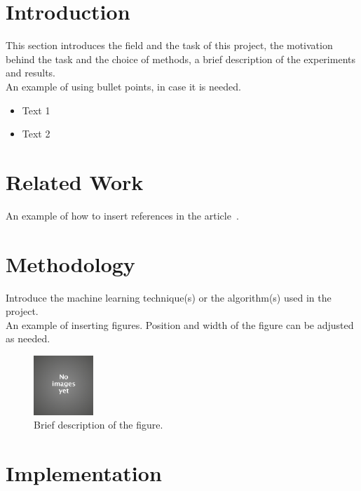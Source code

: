 \documentclass[11pt]{article}
\title{\MakeMeBlue{Enter the project name here}}
\author{Your Name}
\date{Date of Submission}
\begin{document}
\maketitle

\section{Introduction}
This section introduces the field and the task of this project, the motivation behind the task and the choice of methods, a brief description of the experiments and results. \\

An example of using bullet points, in case it is needed.
\begin{itemize}[leftmargin=1cm]
   \item Text 1
   \item Text 2
\end{itemize}

\section{Related Work}
An example of how to insert references in the article~\cite{hu2011}.


\section{Methodology}
Introduce the machine learning technique(s) or the algorithm(s) used in the project. \\

An example of inserting figures. Position and width of the figure can be adjusted as needed.
\begin{figure}[!htp]        
  \centering
    \includegraphics[width=0.2\textwidth]{MyProject-KnowledgeDiscovery/image.jpg}
    \caption{Brief description of the figure.}
\end{figure}

\section{Implementation}
\end{document}
